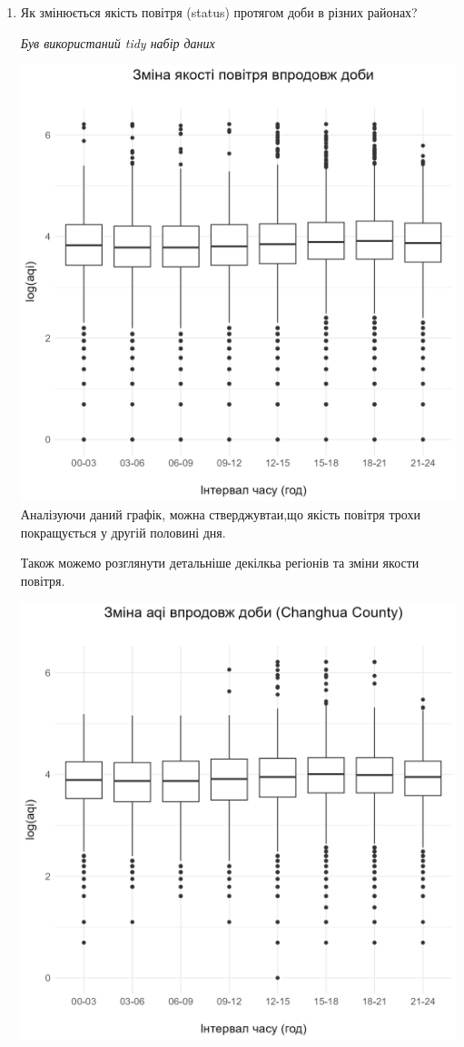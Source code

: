 \documentclass[./report.tex]{subfiles}
\begin{document}
\begin{enumerate}
  \item Як змінюється якість повітря (status) протягом доби в різних районах?
    
  \quad \textit{Був використаний tidy набір даних}

  \includegraphics[width=6in]{plots/question3/box.png}
  Аналізуючи даний графік, можна стверджувтаи,що якість повітря трохи покращується у другій половині дня.
    
  Також можемо розглянути детальніше декілкьа регіонів та зміни якости повітря. 

  \includegraphics[width=6in]{plots/question3/county-box/Changhua County.png}


\end{enumerate}
\end{document}
